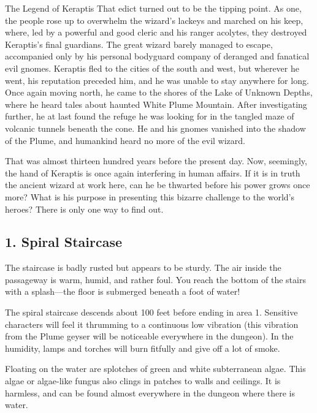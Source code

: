 \documentclass[10pt,a4paper,twoside,bg=print,twocolumn,openany,nodeprecatedcode]{dndbook}
\begin{document}
\begin{DndSidebar}[float=!b]{The Legend of Keraptis}
That edict turned out to be the tipping point. As one, the people rose up to overwhelm the wizard's lackeys and marched on his keep, where, led by a powerful and good cleric and his ranger acolytes, they destroyed Keraptis's final guardians. The great wizard barely managed to escape, accompanied only by his personal bodyguard company of deranged and fanatical evil gnomes. Keraptis fled to the cities of the south and west, but wherever he went, his reputation preceded him, and he was unable to stay anywhere for long. Once again moving north, he came to the shores of the Lake of Unknown Depths, where he heard tales about haunted White Plume Mountain. After investigating further, he at last found the refuge he was looking for in the tangled maze of volcanic tunnels beneath the cone. He and his gnomes vanished into the shadow of the Plume, and humankind heard no more of the evil wizard.



That was almost thirteen hundred years before the present day. Now, seemingly, the hand of Keraptis is once again interfering in human affairs. If it is in truth the ancient wizard at work here, can he be thwarted before his power grows once more? What is his purpose in presenting this bizarre challenge to the world's heroes? There is only one way to find out.



\end{DndSidebar}

\subsection{1. Spiral Staircase}
\begin{DndReadAloud}{}
The staircase is badly rusted but appears to be sturdy. The air inside the passageway is warm, humid, and rather foul. You reach the bottom of the stairs with a splash—the floor is submerged beneath a foot of water!

\end{DndReadAloud}

The spiral staircase descends about 100 feet before ending in area 1. Sensitive characters will feel it thrumming to a continuous low vibration (this vibration from the Plume geyser will be noticeable everywhere in the dungeon). In the humidity, lamps and torches will burn fitfully and give off a lot of smoke.

Floating on the water are splotches of green and white subterranean algae. This algae or algae-like fungus also clings in patches to walls and ceilings. It is harmless, and can be found almost everywhere in the dungeon where there is water.
\end{document}
